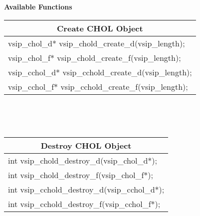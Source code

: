 \\\cvsiplh 
\\ \hspace*{.8cm} \vspace*{.1cm} \textbf{Available Functions }
%
\\ \hspace*{1.cm} {
\ttfamily\vspace{.3cm}
\begin{tabular}[H]{|l|}
\multicolumn{1}{c}{\rmfamily \bfseries Create CHOL Object\vspace{.1cm}}\\ \hline
vsip\_chol\_d* vsip\_chold\_create\_d(vsip\_length);\\
vsip\_chol\_f* vsip\_chold\_create\_f(vsip\_length);\\
vsip\_cchol\_d* vsip\_cchold\_create\_d(vsip\_length);\\
vsip\_cchol\_f* vsip\_cchold\_create\_f(vsip\_length);\\
\hline\end{tabular}\\}
%
\\ \hspace*{1.cm} {
\ttfamily\vspace{.3cm}
\begin{tabular}[H]{|l|}
\multicolumn{1}{c}{\rmfamily \bfseries Destroy CHOL Object\vspace{.1cm}}\\ \hline
int vsip\_chold\_destroy\_d(vsip\_chol\_d*);\\
int vsip\_chold\_destroy\_f(vsip\_chol\_f*);\\
int vsip\_cchold\_destroy\_d(vsip\_cchol\_d*);\\
int vsip\_cchold\_destroy\_f(vsip\_cchol\_f*);\\
\hline\end{tabular}\\}
%
